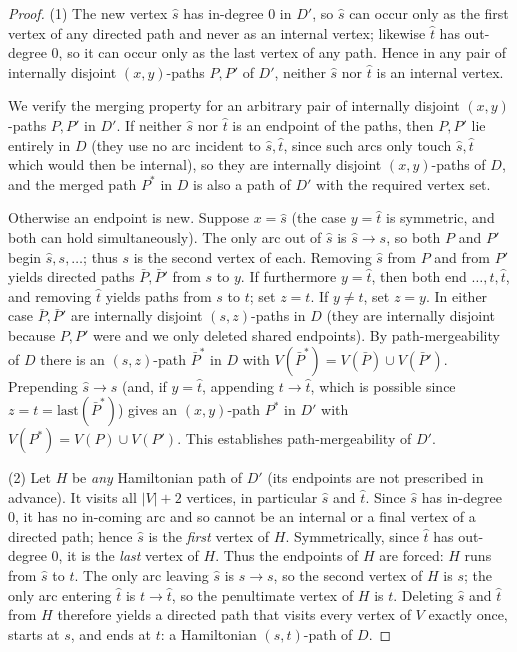 \documentclass[12pt]{article}
\theoremstyle{definition}
\newcommand{\Vv}{V}
\begin{document}
\begin{proof}
(1) The new vertex $\hat s$ has in-degree $0$ in $D'$, so $\hat s$ can occur only
as the first vertex of any directed path and never as an internal vertex; likewise
$\hat t$ has out-degree $0$, so it can occur only as the last vertex of any path.
Hence in any pair of internally disjoint $(x,y)$-paths $P,P'$ of $D'$, neither
$\hat s$ nor $\hat t$ is an internal vertex.

We verify the merging property for an arbitrary pair of internally disjoint
$(x,y)$-paths $P,P'$ in $D'$. If neither $\hat s$ nor $\hat t$ is an endpoint of
the paths, then $P,P'$ lie entirely in $D$ (they use no arc incident to
$\hat s,\hat t$, since such arcs only touch $\hat s,\hat t$ which would then be
internal), so they are internally disjoint $(x,y)$-paths of $D$, and the merged
path $P^{*}$ in $D$ is also a path of $D'$ with the required vertex set.

Otherwise an endpoint is new. Suppose $x=\hat s$ (the case $y=\hat t$ is symmetric,
and both can hold simultaneously). The only arc out of $\hat s$ is $\hat s\to s$,
so both $P$ and $P'$ begin $\hat s,s,\dots$; thus $s$ is the second vertex of each.
Removing $\hat s$ from $P$ and from $P'$ yields directed paths $\bar P,\bar P'$ from
$s$ to $y$. If furthermore $y=\hat t$, then both end $\dots,t,\hat t$, and removing
$\hat t$ yields paths from $s$ to $t$; set $z=t$. If $y\neq\hat t$, set $z=y$. In
either case $\bar P,\bar P'$ are internally disjoint $(s,z)$-paths in $D$ (they are
internally disjoint because $P,P'$ were and we only deleted shared endpoints). By
path-mergeability of $D$ there is an $(s,z)$-path $\bar P^{*}$ in $D$ with
$V(\bar P^{*})=V(\bar P)\cup V(\bar P')$. Prepending $\hat s\to s$ (and, if
$y=\hat t$, appending $t\to\hat t$, which is possible since $z=t=\mathrm{last}
(\bar P^{*})$) gives an $(x,y)$-path $P^{*}$ in $D'$ with
$V(P^{*})=V(P)\cup V(P')$. This establishes path-mergeability of $D'$.

(2) Let $H$ be \emph{any} Hamiltonian path of $D'$ (its endpoints are not
prescribed in advance). It visits all $|\Vv|+2$ vertices, in particular $\hat s$
and $\hat t$. Since $\hat s$ has in-degree $0$, it has no in-coming arc and so
cannot be an internal or a final vertex of a directed path; hence $\hat s$ is the
\emph{first} vertex of $H$. Symmetrically, since $\hat t$ has out-degree $0$, it is
the \emph{last} vertex of $H$. Thus the endpoints of $H$ are forced: $H$ runs from
$\hat s$ to $\hat t$. The only arc leaving $\hat s$ is $\hat s\to s$, so the second
vertex of $H$ is $s$; the only arc entering $\hat t$ is $t\to\hat t$, so the
penultimate vertex of $H$ is $t$. Deleting $\hat s$ and $\hat t$ from $H$ therefore
yields a directed path that visits every vertex of $\Vv$ exactly once, starts at
$s$, and ends at $t$: a Hamiltonian $(s,t)$-path of $D$.


\end{proof}
\end{document}

